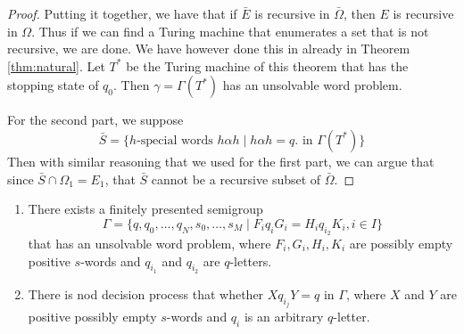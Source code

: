\begin{proof}
  Putting it together, we have that if $\bar{E}$ is recursive in $\bar{\Omega}$, then $E$ is recursive in $\Omega$. Thus if we can find a Turing machine that enumerates a set that is not recursive, we are done. We have however done this in already in Theorem \ref{thm:natural}. Let $T^*$ be the Turing machine of this theorem that has the stopping state of $q_0$. Then $\gamma = \Gamma(T^*)$ has an unsolvable word problem.

  For the second part, we suppose
  \begin{equation*}
    \bar{S} = \{h\text{-special words }h\alpha h \mid h\alpha h = q. \text{ in } \Gamma(T^*) \}
  \end{equation*}
  Then with similar reasoning that we used for the first part, we can argue that since $\bar{S} \cap \Omega_1 = E_1$, that $\bar{S}$ cannot be a recursive subset of $\bar{\Omega}$.
\end{proof}

\begin{corollary}
  \label{cor:markov-post}
  \begin{enumerate}
  \item There exists a finitely presented semigroup
    \begin{equation*}
      \Gamma = \{q,q_0, \dots, q_N,s_0, \dots, s_M \mid F_iq_iG_i = H_iq_{i_2}K_i,i \in I\}
    \end{equation*}
    that has an unsolvable word problem, where $F_i,G_i,H_i,K_i$ are possibly empty positive $s$-words and $q_{i_1}$ and $q_{i_2}$ are $q$-letters.
  \item There is nod decision process that whether $X q_{i_j} Y = q$ in $\Gamma$, where $X$ and $Y$ are positive possibly empty $s$-words and $q_i$ is an arbitrary $q$-letter.
  \end{enumerate}
\end{corollary}

